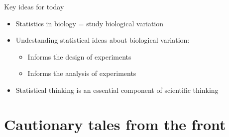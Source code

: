 \documentclass[10pt]{beamer}
\begin{document}
\begin{frame}{Key ideas for today}
\begin{block}{}
\begin{itemize}[<+->]
 \item Statistics in biology = study biological variation
 \item Undestanding statistical ideas about biological variation:
    \begin{itemize}
     \item Informs the design of experiments
     \item Informs the analysis of experiments
    \end{itemize}
 \item Statistical thinking is an essential component of scientific thinking
\end{itemize}
\end{block}
\end{frame}



\section{Cautionary tales from the front}

\end{document}
